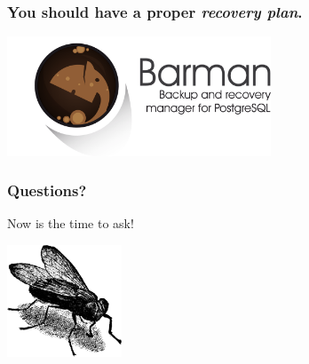 \documentclass{beamer}
\begin{document}
\begin{frame}
  \frametitle{You should have a proper \textit{recovery plan}.}

  
  \begin{center}
    \includegraphics[height=1.4in]{pgbarman.png}
  \end{center}
\end{frame}

\begin{frame}
  \frametitle{Questions?}

\begin{center}
  Now is the time to ask!
  \vfill

  \includegraphics[height=9em]{fly.png}
\end{center}
\end{frame}
\end{document}
